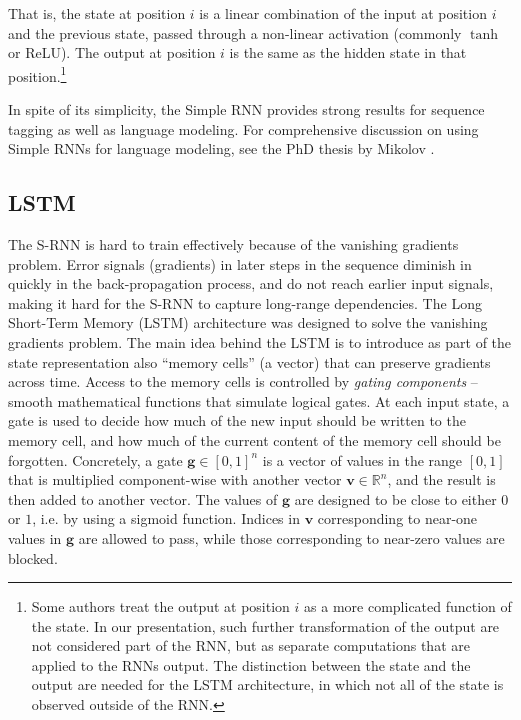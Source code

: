 \documentclass[jair,twoside,11pt,theapa]{article}
\newcommand{\m}[1]{\mathbf{#1}}%
\renewcommand{\shortcite}[0]{\citeyear}
\begin{document}
{That is, the state at position $i$ is a linear combination of the input at
position $i$ and the previous state, passed through a non-linear activation
(commonly $\tanh$ or ReLU).
The output at position $i$ is the same as
the hidden state in that position.\footnote{Some authors treat the output at
position $i$ as a more complicated function of the state.  In our presentation,
such further transformation of the output are not considered part of the RNN,
but as separate computations that are applied to the RNNs output.
The distinction between the state and the output are needed for the LSTM
architecture, in which not all of the state is observed outside of the RNN.}

In spite of its simplicity, the Simple RNN provides strong results for sequence
tagging \cite{xu2015ccg} as well as language modeling.
For comprehensive discussion on using Simple RNNs for language modeling, see
the PhD thesis by Mikolov \shortcite{mikolov2012statistical}.

\subsection{LSTM}

The S-RNN is hard to train effectively because of the vanishing gradients problem.
Error signals (gradients) in later steps in the sequence diminish in quickly in the back-propagation
process, and do not reach earlier input signals, making it hard for the S-RNN to capture
long-range dependencies.  The Long Short-Term Memory (LSTM) architecture \cite{hochreiter1997long}
was designed to solve the vanishing gradients problem.  The main idea behind the LSTM is
to introduce as part of the state representation also ``memory cells'' (a vector) that can preserve
gradients across time.  Access to the memory cells is controlled by \emph{gating components} -- smooth
mathematical functions that simulate logical gates.  At each input state, a gate is used to decide how
much of the new input should be written to the memory cell, and how much of the current content of the memory
cell should be forgotten.
Concretely, a gate $\m{g} \in [0,1]^n$ is a vector of values in the range $[0,1]$ that is multiplied
component-wise with another vector $\m{v} \in \mathbb{R}^n$, and the result is then added to another vector.
The values of $\m{g}$ are designed to be close to either $0$ or $1$, i.e. by using a sigmoid function.
Indices in $\m{v}$ corresponding to near-one values in $\m{g}$ are allowed
to pass, while those corresponding to near-zero values are blocked.

}
\end{document}
